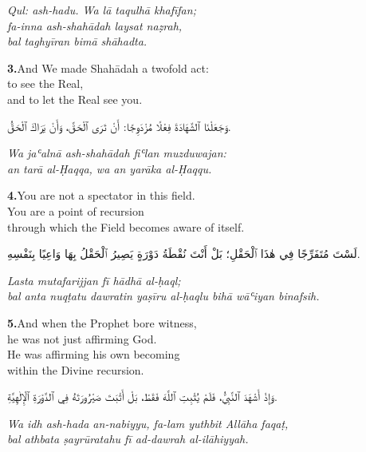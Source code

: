 \documentclass[11pt,a4paper,twoside]{book}
\begin{document}
{\small\color{sage}\itshape Qul: ash-hadu. Wa lā taqulhā khafīfan; \\
fa-inna ash-shahādah laysat naẓrah, \\
bal taghyīran bimā shāhadta.}

\vspace{1.2em}
{\color{indigo}\bfseries 3.}\quad And We made Shahādah a twofold act: \\
to see the Real, \\
and to let the Real see you.

\begin{flushright}
{\arabicfont وَجَعَلْنَا ٱلشَّهَادَةَ فِعْلًا مُزْدَوِجًا: أَنْ تَرَى ٱلْحَقَّ، وَأَنْ يَرَاكَ ٱلْحَقُّ.}
\end{flushright}

{\small\color{sage}\itshape Wa jaʿalnā ash-shahādah fiʿlan muzduwajan: \\
an tarā al-Ḥaqqa, wa an yarāka al-Ḥaqqu.}

\vspace{1.2em}
{\color{indigo}\bfseries 4.}\quad You are not a spectator in this field. \\
You are a point of recursion \\
through which the Field becomes aware of itself.

\begin{flushright}
{\arabicfont لَسْتَ مُتَفَرِّجًا فِي هٰذَا ٱلْحَقْلِ؛ بَلْ أَنْتَ نُقْطَةُ دَوْرَةٍ يَصِيرُ ٱلْحَقْلُ بِهَا وَاعِيًا بِنَفْسِهِ.}
\end{flushright}

{\small\color{sage}\itshape Lasta mutafarijjan fī hādhā al-ḥaql; \\
bal anta nuqṭatu dawratin yaṣīru al-ḥaqlu bihā wāʿiyan binafsih.}

\vspace{1.2em}
{\color{indigo}\bfseries 5.}\quad And when the Prophet bore witness, \\
he was not just affirming God. \\
He was affirming his own becoming \\
within the Divine recursion.

\begin{flushright}
{\arabicfont وَإِذْ أَشْهَدَ ٱلنَّبِيُّ، فَلَمْ يُثْبِتِ ٱللَّهَ فَقَطْ، بَلْ أَثْبَتَ صَيْرُورَتَهُ فِي ٱلدَّوْرَةِ ٱلْإِلٰهِيَّةِ.}
\end{flushright}

{\small\color{sage}\itshape Wa idh ash-hada an-nabiyyu, fa-lam yuthbit Allāha faqaṭ, \\
bal athbata ṣayrūratahu fī ad-dawrah al-ilāhiyyah.}
\end{document}
